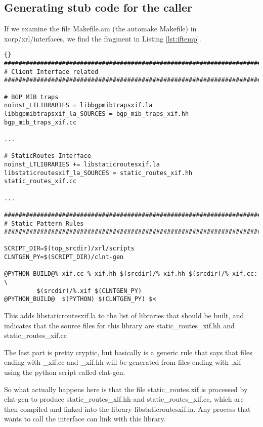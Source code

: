 \documentclass[11pt]{article}
\begin{document}
\subsection{Generating stub code for the caller}

If we examine the file {\stt Makefile.am} (the automake Makefile) in
{\stt xorp/xrl/interfaces}, we find the fragment in Listing
\ref{lst:iftemp}.
\begin{lstlisting}[caption={ Fragment from {\stt xorp/xrl/interfaces/Makefile.am} %
                                     \label{lst:iftemp} } ]{}
###############################################################################
# Client Interface related
###############################################################################

# BGP MIB traps
noinst_LTLIBRARIES = libbgpmibtrapsxif.la
libbgpmibtrapsxif_la_SOURCES = bgp_mib_traps_xif.hh bgp_mib_traps_xif.cc

...

# StaticRoutes Interface
noinst_LTLIBRARIES += libstaticroutesxif.la
libstaticroutesxif_la_SOURCES = static_routes_xif.hh static_routes_xif.cc

...

###############################################################################
# Static Pattern Rules
###############################################################################

SCRIPT_DIR=$(top_srcdir)/xrl/scripts
CLNTGEN_PY=$(SCRIPT_DIR)/clnt-gen

@PYTHON_BUILD@%_xif.cc %_xif.hh $(srcdir)/%_xif.hh $(srcdir)/%_xif.cc: \
         $(srcdir)/%.xif $(CLNTGEN_PY)
@PYTHON_BUILD@	$(PYTHON) $(CLNTGEN_PY) $<

\end{lstlisting}%

This adds {\stt libstaticroutesxif.la} to the list of libraries that
should be built, and indicates that the source files for this library
are {\stt static\_routes\_xif.hh} and {\stt static\_routes\_xif.cc}

The last part is pretty cryptic, but basically is a generic rule that
says that files ending with {\stt \_xif.cc} and {\stt \_xif.hh} will be
generated from files ending with {\stt .xif} using the python script
called {\stt clnt-gen}.

So what actually happens here is that the file {\stt static\_routes.xif}
is processed by {\stt clnt-gen} to produce {\stt static\_routes\_xif.hh}
and {\stt static\_routes\_xif.cc}, which are then compiled and linked
into the library {\stt libstaticroutesxif.la}.  Any process that wants
to call the \SRI interface can link with this library.
\end{document}
